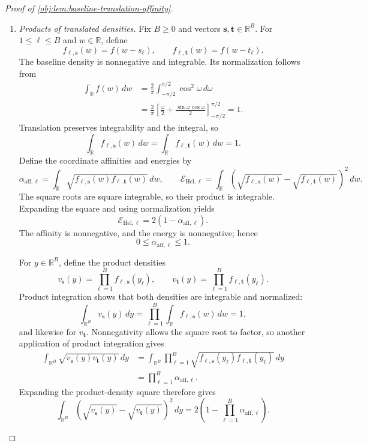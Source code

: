 \documentclass[11pt]{article}
\begin{document}
\begin{proof}[Proof of \cref{obj:lem:baseline-translation-affinity}]
\begin{enumerate}
\item \emph{Products of translated densities.}
Fix \(B\ge0\) and vectors \(\boldsymbol s,\boldsymbol t\in\mathbb R^B\). For \(1\le\ell\le B\) and \(w\in\mathbb R\), define
\[
f_{\ell,\boldsymbol s}(w)=f(w-s_\ell),
\qquad
f_{\ell,\boldsymbol t}(w)=f(w-t_\ell).
\]
The baseline density is nonnegative and integrable. Its normalization follows from
\[
\begin{aligned}
\int_{\mathbb R}f(w)\,dw
&=\frac{2}{\pi}\int_{-\pi/2}^{\pi/2}\cos^2\omega\,d\omega\\
&=\frac{2}{\pi}
  \left[\frac{\omega}{2}
        +\frac{\sin\omega\cos\omega}{2}\right]_{-\pi/2}^{\pi/2}
=1.
\end{aligned}
\]
Translation preserves integrability and the integral, so
\[
\int_{\mathbb R}f_{\ell,\boldsymbol s}(w)\,dw
=\int_{\mathbb R}f_{\ell,\boldsymbol t}(w)\,dw=1.
\]
Define the coordinate affinities and energies by
\[
\alpha_{\mathrm{aff},\ell}
=\int_{\mathbb R}
\sqrt{f_{\ell,\boldsymbol s}(w)f_{\ell,\boldsymbol t}(w)}\,dw,
\qquad
\mathcal E_{\mathrm{Hel},\ell}
=\int_{\mathbb R}
\left(\sqrt{f_{\ell,\boldsymbol s}(w)}
      -\sqrt{f_{\ell,\boldsymbol t}(w)}\right)^2\,dw.
\]
The square roots are square integrable, so their product is integrable. Expanding the square and using normalization yields
\[
\mathcal E_{\mathrm{Hel},\ell}
=2(1-\alpha_{\mathrm{aff},\ell}).
\]
The affinity is nonnegative, and the energy is nonnegative; hence
\[
0\le\alpha_{\mathrm{aff},\ell}\le1.
\]

For \(y\in\mathbb R^B\), define the product densities
\[
v_{\boldsymbol s}(y)=\prod_{\ell=1}^B f_{\ell,\boldsymbol s}(y_\ell),
\qquad
v_{\boldsymbol t}(y)=\prod_{\ell=1}^B f_{\ell,\boldsymbol t}(y_\ell).
\]
Product integration shows that both densities are integrable and normalized:
\[
\int_{\mathbb R^B}v_{\boldsymbol s}(y)\,dy
=\prod_{\ell=1}^B\int_{\mathbb R}f_{\ell,\boldsymbol s}(w)\,dw=1,
\]
and likewise for \(v_{\boldsymbol t}\).
Nonnegativity allows the square root to factor, so another application of product integration gives
\[
\begin{aligned}
\int_{\mathbb R^B}\sqrt{v_{\boldsymbol s}(y)v_{\boldsymbol t}(y)}\,dy
&=\int_{\mathbb R^B}
\prod_{\ell=1}^B
\sqrt{f_{\ell,\boldsymbol s}(y_\ell)
      f_{\ell,\boldsymbol t}(y_\ell)}\,dy\\
&=\prod_{\ell=1}^B\alpha_{\mathrm{aff},\ell}.
\end{aligned}
\]
Expanding the product-density square therefore gives
\[
\int_{\mathbb R^B}
\left(\sqrt{v_{\boldsymbol s}(y)}
      -\sqrt{v_{\boldsymbol t}(y)}\right)^2\,dy
=2\left(1-\prod_{\ell=1}^B\alpha_{\mathrm{aff},\ell}\right).
\]


\end{enumerate}
\end{proof}
\end{document}
